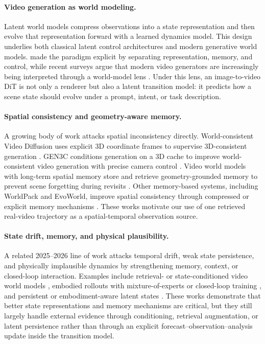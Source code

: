 \documentclass{article}
\begin{document}
\paragraph{Video generation as world modeling.}
Latent world models compress observations into a state representation and then evolve that representation forward with a learned dynamics model. This design underlies both classical latent control architectures and modern generative world models. \citet{ha2018world} made the paradigm explicit by separating representation, memory, and control, while recent surveys argue that modern video generators are increasingly being interpreted through a world-model lens \citep{videoworldmodelsreview2026, mechanisticview2026}. Under this lens, an image-to-video DiT is not only a renderer but also a latent transition model: it predicts how a scene state should evolve under a prompt, intent, or task description.

\paragraph{Spatial consistency and geometry-aware memory.}
A growing body of work attacks spatial inconsistency directly. World-consistent Video Diffusion uses explicit 3D coordinate frames to supervise 3D-consistent generation \citep{worldconsistentdiffusion2024}. GEN3C conditions generation on a 3D cache to improve world-consistent video generation with precise camera control \citep{gen3c2025}. Video world models with long-term spatial memory store and retrieve geometry-grounded memory to prevent scene forgetting during revisits \citep{spatialmemory2025}. Other memory-based systems, including WorldPack and EvoWorld, improve spatial consistency through compressed or explicit memory mechanisms \citep{worldpack2025, evoworld2025}. These works motivate our use of one retrieved real-video trajectory as a spatial-temporal observation source.

\paragraph{State drift, memory, and physical plausibility.}
A related 2025--2026 line of work attacks temporal drift, weak state persistence, and physically implausible dynamics by strengthening memory, context, or closed-loop interaction. Examples include retrieval- or state-conditioned video world models \citep{chen2025interactiveworldmodels, icworld2025}, embodied rollouts with mixture-of-experts or closed-loop training \citep{longscape2025, worldinworld2025}, and persistent or embodiment-aware latent states \citep{persistentworld2025, bridgev2w2026}. These works demonstrate that better state representations and memory mechanisms are critical, but they still largely handle external evidence through conditioning, retrieval augmentation, or latent persistence rather than through an explicit forecast--observation--analysis update inside the transition model.
\end{document}

